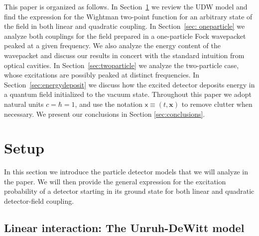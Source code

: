 \documentclass[11pt,prd,onecolumn,superscriptaddress,nofootinbib,floatfix,amsmath,amssymb]{revtex4-2}
\newcommand{\bx}{\bm{x}}
\newcommand{\sx}{\mathsf{x}}
\begin{document}
    This paper is organized as follows. In Section~\ref{sec:setup} we review the UDW model and find the expression for the Wightman two-point function for an arbitrary state of the field in both linear and quadratic coupling. In Section~\ref{sec: oneparticle} we analyze both couplings for the field prepared in a one-particle Fock wavepacket peaked at a given frequency. We also analyze the energy content of the wavepacket and discuss our results in concert with the standard intuition from optical cavities. In Section~\ref{sec:twoparticle} we analyze the two-particle case, whose excitations are possibly peaked at distinct frequencies. In Section~\ref{sec:energydeposit} we discuss how the excited detector deposits energy in a quantum field initialized to the vacuum state. Throughout this paper we adopt natural units $c= \hbar = 1$, and use the notation $\sx\equiv (t,\bx)$ to remove clutter when necessary. We present our conclusions in Section \ref{sec:conclusions}.
    
    
    
    
    
    
    
    
    
    
   
    \section{Setup}
    \label{sec:setup}
    
    In this section we introduce the particle detector models that we will analyze in the paper. We will then provide the general expression for the excitation probability of a detector starting in its ground state for both linear and quadratic detector-field coupling. %
    
    
    
    
    
    
    
    
    
    
    
    
    \subsection{Linear interaction: The Unruh-DeWitt model}
    \label{subsec: linear-interaction-setup}
	
\end{document}
